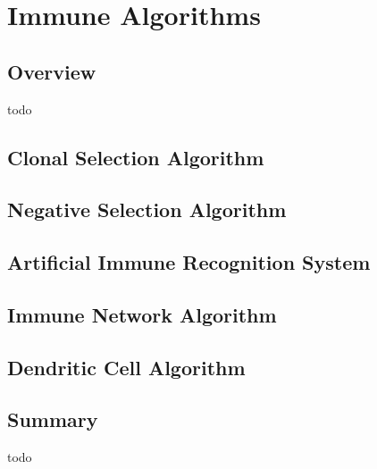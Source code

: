 


\chapter{Immune Algorithms}
\label{ch:immune}

\section{Overview}
todo

\newpage\section{Clonal Selection Algorithm}
\newpage\section{Negative Selection Algorithm}
\newpage\section{Artificial Immune Recognition System}
\newpage\section{Immune Network Algorithm}
\newpage\section{Dendritic Cell Algorithm}
\newpage

\section{Summary}
todo
